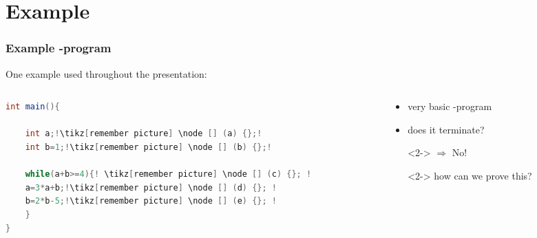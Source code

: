 \section{Example}
\frame{\tableofcontents[currentsection]}

\begin{frame}[fragile] %
  \frametitle{Example -program} %
  One example used throughout the presentation:
  \begin{columns}
  	\begin{column}{6cm}
  		\begin{lstlisting}[language = java,escapechar = !]
int main(){
  		
	int a;!\tikz[remember picture] \node [] (a) {};!
	int b=1;!\tikz[remember picture] \node [] (b) {};!
  		
	while(a+b>=4){! \tikz[remember picture] \node [] (c) {}; !
    a=3*a+b;!\tikz[remember picture] \node [] (d) {}; !
    b=2*b-5;!\tikz[remember picture] \node [] (e) {}; !
	}
}		
  		\end{lstlisting}
%  		
%  		
  	\end{column}
	\begin{column}{5cm}
		\begin{itemize}			
			\item very basic -program
			\item does it terminate?
			\item[]<2-> $\Rightarrow$ \color{red}No!\color{black}
			\item[]<2-> how can we prove this?
		\end{itemize}
	\end{column}
  \end{columns}
\end{frame}